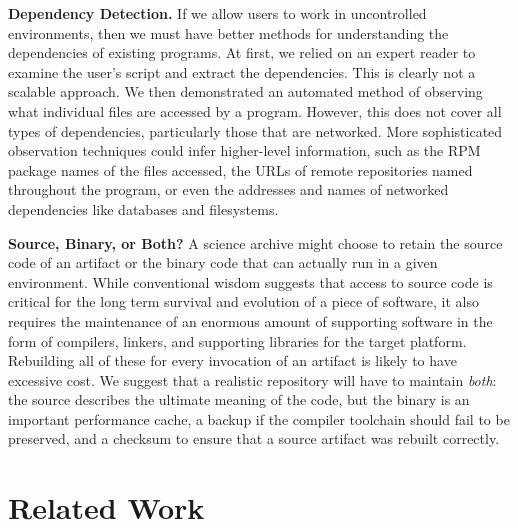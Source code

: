 \documentclass[procedia]{easychair}
\begin{document}
{\bf Dependency Detection.}  If we allow users to work in uncontrolled
environments, then we must have better methods for understanding the dependencies  of existing programs.  At first, we relied on an expert reader to examine
the user's script and extract the dependencies.  This is clearly
not a scalable approach.  We then demonstrated an automated method of observing
what individual files are accessed by a program. However, this does
not cover all types of dependencies, particularly those that are networked.
More sophisticated observation techniques could infer higher-level information,
such as the RPM package names of the files accessed, the URLs of remote
repositories named throughout the program, or even the addresses and names of networked dependencies like databases and filesystems.

{\bf Source, Binary, or Both?}  A science archive might choose to retain
the source code of an artifact or the binary code that can actually run in a given environment.
While conventional wisdom suggests that access to source code is critical for the long term
survival and evolution of a piece of software, it also requires the maintenance of an enormous
amount of supporting software in the form of compilers, linkers, and supporting libraries for
the target platform.  Rebuilding all of these for every invocation of an artifact is
likely to have excessive cost.  We suggest that a realistic repository will have to
maintain \emph{both}: the source describes the ultimate meaning of the code, but
the binary is an important performance cache, a backup if the compiler toolchain should
fail to be preserved, and a checksum to ensure that a source artifact was rebuilt correctly.

\section{Related Work }
\end{document}
